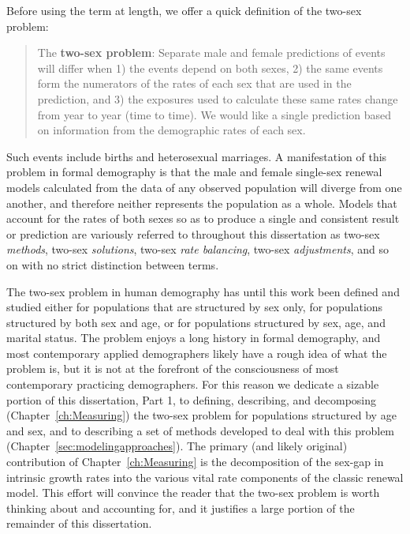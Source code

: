 Before using the term at length, we offer a quick definition of the two-sex
problem:

\begin{singlespace}
\begin{quote}
The \textbf{two-sex problem}: Separate male and female predictions of events
will differ when 1) the events depend on both sexes, 2) the same events 
form the numerators of the rates of each sex that are used in the prediction,
and 3) the exposures used to calculate these same rates change from year to year
(time to time). We would like a single prediction based on information from the
demographic rates of each sex.
\end{quote}
\end{singlespace}

 Such events include births and heterosexual marriages.
 A manifestation of this problem in formal demography is that the male
 and female single-sex renewal models calculated from the data of any observed 
 population will diverge from one another, and therefore neither represents
 the population as a whole. Models that account for the rates of both sexes
 so as to produce a single and consistent result or prediction are
 variously referred to throughout this dissertation as two-sex \textit{methods},
 two-sex \textit{solutions}, two-sex \textit{rate balancing}, two-sex 
 \textit{adjustments}, and so on with no strict distinction between terms.
 
 The two-sex problem in human demography has until this work been defined 
 and studied either for populations that are structured by sex only, for
 populations structured by both sex and age, or for populations structured by
 sex, age, and marital status. The problem enjoys a long history in formal demography, and most
contemporary applied demographers likely have a rough idea of what the problem
is, but it is not at the forefront of the consciousness of most contemporary
practicing demographers. For this reason we dedicate a sizable portion of 
this dissertation, Part 1, to defining, describing,
and decomposing (Chapter~\ref{ch:Measuring}) the two-sex problem for populations
structured by age and sex, and to describing a set of methods developed to deal
with this problem (Chapter~\ref{sec:modelingapproaches}). The primary (and likely
original) contribution of Chapter~\ref{ch:Measuring} is the decomposition of the 
sex-gap in intrinsic growth rates into the various vital rate components of the 
classic renewal model. This effort will convince the reader that the two-sex
problem is worth thinking about and accounting for, and it justifies a large
portion of the remainder of this dissertation.

